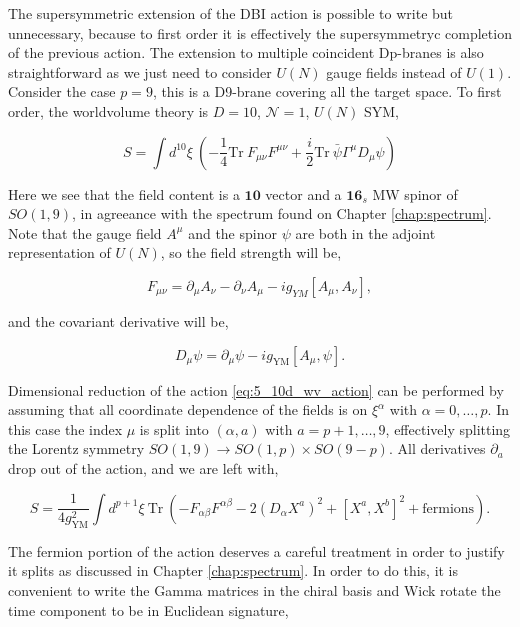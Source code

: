 The supersymmetric extension of the DBI action is possible to write but unnecessary, because to first order it is effectively the supersymmetryc completion of the previous action. The extension to multiple coincident Dp-branes is also straightforward as we just need to consider $U(N)$ gauge fields instead of $U(1)$. Consider the case $p=9$, this is a D9-brane covering all the target space. To first order, the worldvolume theory is $D = 10$, $\mathcal{N} = 1$, $U(N)$ SYM,

\begin{equation}
    \label{eq:5_10d_wv_action}
    S=\int d^{10}\xi\mathrm{~}\left(-\frac14\mathrm{Tr~}F_{\mu\nu}F^{\mu\nu}+\frac i2\mathrm{Tr~}\bar{\psi}\Gamma^\mu D_\mu\psi\right)
\end{equation}

Here we see that the field content is a $\mathbf{10}$ vector and a $\mathbf{16}_s$ MW spinor of $SO(1,9)$, in agreeance with the spectrum found on Chapter \ref{chap:spectrum}. Note that the gauge field $A^\mu$ and the spinor $\psi$ are both in the adjoint representation of $U(N)$, so the field strength will be,

\begin{equation}
    F_{\mu\nu}=\partial_\mu A_\nu-\partial_\nu A_\mu-ig_{YM}[A_\mu,A_\nu],
\end{equation}

and the covariant derivative will be,

\begin{equation}
    D_\mu\psi=\partial_\mu\psi-ig_{\mathrm{YM}}[A_\mu,\psi].
\end{equation}

Dimensional reduction of the action \ref{eq:5_10d_wv_action} can be performed by assuming that all coordinate dependence of the fields is on $\xi^\alpha$ with $\alpha = 0,\dots,p$. In this case the index $\mu$ is split into $(\alpha, a)$ with $a = p+1, \dots, 9$, effectively splitting the Lorentz symmetry $SO(1,9) \rightarrow SO(1,p) \times SO(9-p)$. All derivatives $\partial_a$ drop out of the action, and we are left with,

\begin{equation}
    S=\frac1{4g_{\mathrm{YM}}^2}\int d^{p+1}\xi\mathrm{~Tr~}(-F_{\alpha\beta}F^{\alpha\beta}-2(D_\alpha X^a)^2+[X^a,X^b]^2+\mathrm{fermions}).
\end{equation}

The fermion portion of the action deserves a careful treatment in order to justify it splits as discussed in Chapter \ref{chap:spectrum}. In order to do this, it is convenient to write the Gamma matrices in the chiral basis \cite{spinors_n_dim} and Wick rotate the time component to be in Euclidean signature,

